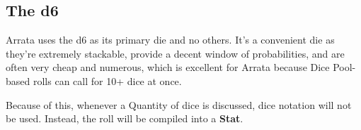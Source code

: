 \documentclass[../main.tex]{subfiles}
\begin{document}
    \subsection{The d6}

    Arrata uses the d6 as its primary die and no others. It's a convenient die as they're extremely stackable, provide a decent window of probabilities, and are often very cheap and numerous, which is excellent for Arrata because Dice Pool-based rolls can call for 10+ dice at once.

    Because of this, whenever a Quantity of dice is discussed, dice notation will not be used. Instead, the roll will be compiled into a \textbf{Stat}.
\end{document}
